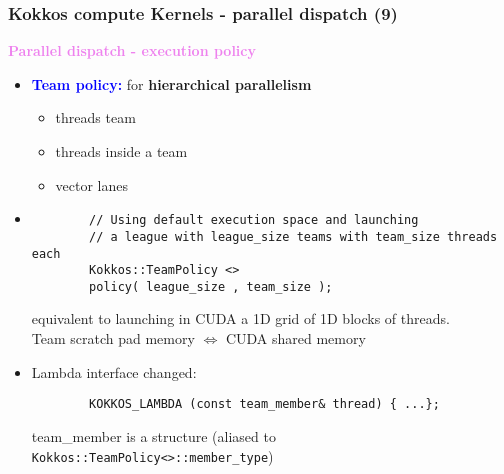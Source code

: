 \begin{frame}[fragile=singleslide]
  \frametitle{Kokkos compute Kernels - parallel dispatch (9)}

  {\Large \textcolor{violet}{\textbf{Parallel dispatch - execution policy}}}

  \begin{itemize}
  \item \textcolor{blue}{\bf Team policy:} for {\bf hierarchical parallelism}
    \begin{itemize}
    \item threads team %
    \item threads inside a team %
    \item vector lanes
    \end{itemize}
  \item
    {\small
      \begin{verbatim}
        // Using default execution space and launching
        // a league with league_size teams with team_size threads each
        Kokkos::TeamPolicy <>
        policy( league_size , team_size );
      \end{verbatim}
    }
    equivalent to launching in CUDA a 1D grid of 1D blocks of threads.\\
    Team scratch pad memory $\Longleftrightarrow$ CUDA shared memory
  \item Lambda interface changed:
    {\small
      \begin{verbatim}
        KOKKOS_LAMBDA (const team_member& thread) { ...};
      \end{verbatim}
    }
    team\_member is a structure (aliased to \texttt{Kokkos::TeamPolicy<>::member\_type})
  \end{itemize}
\end{frame}

